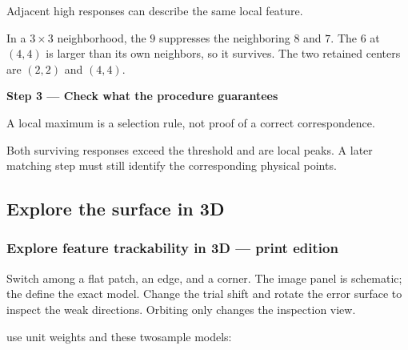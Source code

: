 \documentclass[letterpaper,11pt,english,openany,oneside]{jupyterBook}
\begin{document}
\begin{TextbookBox}
\sphinxAtStartPar
{} Adjacent high responses can describe the same local feature.

\sphinxAtStartPar
In a {\color{QuizMathBlue} \(3\times3\)} neighborhood, the {\color{QuizMathBlue} \(9\)} suppresses the neighboring {\color{QuizMathBlue} \(8\)} and {\color{QuizMathBlue} \(7\)}. The {\color{QuizMathBlue} \(6\)} at {\color{QuizMathBlue} \((4,4)\)} is larger than its own neighbors, so it survives. The two retained centers are {\color{QuizMathBlue} \((2,2)\)} and {\color{QuizMathBlue} \((4,4)\)}.

\par

\par\medskip{}
{\color{QuizStepRed}\bfseries Step 3 — Check what the procedure guarantees}\par\smallskip

\sphinxAtStartPar
{} A local maximum is a selection rule, not proof of a correct correspondence.

\sphinxAtStartPar
Both surviving responses exceed the threshold and are local peaks. A later matching step must still identify the corresponding physical points.

\par

\end{TextbookBox}


\subsection{Explore the surface in 3D}
\label{\detokenize{lectures/lecture05/corners:explore-the-surface-in-3d}}
\subsubsection*{Explore feature trackability in 3D — print edition}

\sphinxAtStartPar
Switch among a flat patch, an edge, and a corner. The image panel is schematic; the  define the exact model. Change the trial shift and rotate the error surface to inspect the weak directions. Orbiting only changes the inspection view.

\sphinxAtStartPar
{} use unit weights and these two\sphinxhyphen{}sample models:
\end{document}

